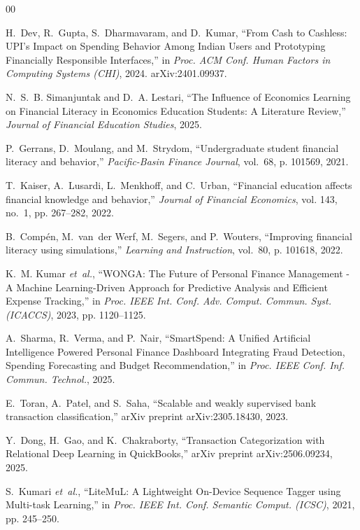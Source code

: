 \documentclass[conference]{IEEEtran}
\begin{document}
\newpage
\begin{thebibliography}{00}

H.~Dev, R.~Gupta, S.~Dharmavaram, and D.~Kumar, ``From Cash to Cashless: UPI's Impact on Spending Behavior Among Indian Users and Prototyping Financially Responsible Interfaces,'' in \emph{Proc. ACM Conf. Human Factors in Computing Systems (CHI)}, 2024. arXiv:2401.09937.

N.~S.~B. Simanjuntak and D.~A. Lestari, ``The Influence of Economics Learning on Financial Literacy in Economics Education Students: A Literature Review,'' \emph{Journal of Financial Education Studies}, 2025.

P.~Gerrans, D.~Moulang, and M.~Strydom, ``Undergraduate student financial literacy and behavior,'' \emph{Pacific-Basin Finance Journal}, vol.~68, p. 101569, 2021.

T.~Kaiser, A.~Lusardi, L.~Menkhoff, and C.~Urban, ``Financial education affects financial knowledge and behavior,'' \emph{Journal of Financial Economics}, vol. 143, no.~1, pp. 267--282, 2022.

B.~Comp{\'e}n, M.~van~der Werf, M.~Segers, and P.~Wouters, ``Improving financial literacy using simulations,'' \emph{Learning and Instruction}, vol.~80, p. 101618, 2022.

K.~M. Kumar \emph{et~al.}, ``WONGA: The Future of Personal Finance Management - A Machine Learning-Driven Approach for Predictive Analysis and Efficient Expense Tracking,'' in \emph{Proc. IEEE Int. Conf. Adv. Comput. Commun. Syst. (ICACCS)}, 2023, pp. 1120--1125.

A.~Sharma, R.~Verma, and P.~Nair, ``SmartSpend: A Unified Artificial Intelligence Powered Personal Finance Dashboard Integrating Fraud Detection, Spending Forecasting and Budget Recommendation,'' in \emph{Proc. IEEE Conf. Inf. Commun. Technol.}, 2025.

E.~Toran, A.~Patel, and S.~Saha, ``Scalable and weakly supervised bank transaction classification,'' arXiv preprint arXiv:2305.18430, 2023.

Y.~Dong, H.~Gao, and K.~Chakraborty, ``Transaction Categorization with Relational Deep Learning in QuickBooks,'' arXiv preprint arXiv:2506.09234, 2025.

S.~Kumari \emph{et~al.}, ``LiteMuL: A Lightweight On-Device Sequence Tagger using Multi-task Learning,'' in \emph{Proc. IEEE Int. Conf. Semantic Comput. (ICSC)}, 2021, pp. 245--250.


\end{thebibliography}
\end{document}
